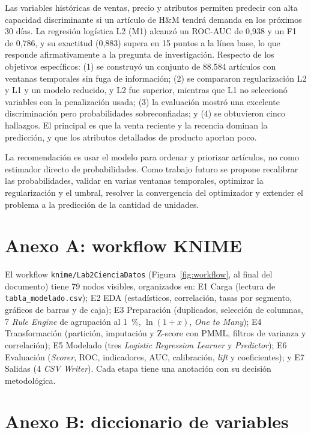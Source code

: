 \documentclass[
  journal=largetwo,
  manuscript=Laboratorio-Numero-02,
  year=2026,
  volume=1
]{cup-journal}
\begin{document}
Las variables históricas de ventas, precio y atributos permiten predecir con alta capacidad discriminante si un artículo de H\&M tendrá demanda en los próximos 30 días. La regresión logística L2 (M1) alcanzó un ROC-AUC de 0,938 y un F1 de 0,786, y su exactitud (0,883) supera en 15 puntos a la línea base, lo que responde afirmativamente a la pregunta de investigación. Respecto de los objetivos específicos: (1) se construyó un conjunto de 88.584 artículos con ventanas temporales sin fuga de información; (2) se compararon regularización L2 y L1 y un modelo reducido, y L2 fue superior, mientras que L1 no seleccionó variables con la penalización usada; (3) la evaluación mostró una excelente discriminación pero probabilidades sobreconfiadas; y (4) se obtuvieron cinco hallazgos. El principal es que la venta reciente y la recencia dominan la predicción, y que los atributos detallados de producto aportan poco.

La recomendación es usar el modelo para ordenar y priorizar artículos, no como estimador directo de probabilidades. Como trabajo futuro se propone recalibrar las probabilidades, validar en varias ventanas temporales, optimizar la regularización y el umbral, resolver la convergencia del optimizador y extender el problema a la predicción de la cantidad de unidades.

\printendnotes
\printbibliography[title={Referencias}]

\appendix
\clearpage
\onecolumn

\section{Anexo A: workflow KNIME}

El workflow \texttt{knime/Lab2CienciaDatos} (Figura~\ref{fig:workflow}, al final del documento) tiene 79 nodos visibles, organizados en: E1 Carga (lectura de \texttt{tabla\_modelado.csv}); E2 EDA (estadísticos, correlación, tasas por segmento, gráficos de barras y de caja); E3 Preparación (duplicados, selección de columnas, 7 \textit{Rule Engine} de agrupación al 1~\%, $\ln(1+x)$, \textit{One to Many}); E4 Transformación (partición, imputación y Z-score con PMML, filtros de varianza y correlación); E5 Modelado (tres \textit{Logistic Regression Learner} y \textit{Predictor}); E6 Evaluación (\textit{Scorer}, ROC, indicadores, AUC, calibración, \textit{lift} y coeficientes); y E7 Salidas (4 \textit{CSV Writer}). Cada etapa tiene una anotación con su decisión metodológica.


\section{Anexo B: diccionario de variables}
\end{document}
